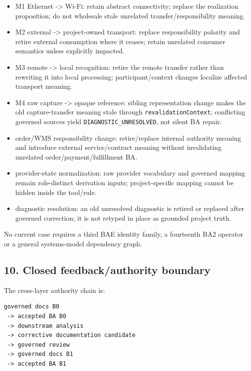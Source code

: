 \documentclass[11pt,a4paper]{article}
\providecommand{\tightlist}{\setlength{\itemsep}{0pt}\setlength{\parskip}{0pt}}
\begin{document}
\begin{itemize}
\tightlist
\item
  M1 Ethernet -\textgreater{} Wi-Fi: retain abstract connectivity; replace the realization proposition; do not wholesale stale unrelated transfer/responsibility meaning.
\item
  M2 external -\textgreater{} project-owned transport: replace responsibility polarity and retire external consumption where it ceases; retain unrelated consumer semantics unless explicitly impacted.
\item
  M3 remote -\textgreater{} local recognition: retire the remote transfer rather than rewriting it into local processing; participant/context changes localize affected transport meaning.
\item
  M4 raw capture -\textgreater{} opaque reference: sibling representation change makes the old capture-transfer meaning stale through \texttt{revalidationContext}; conflicting governed sources yield \texttt{DIAGNOSTIC\_UNRESOLVED}, not silent BA repair.
\item
  order/WMS responsibility change: retire/replace internal authority meaning and introduce external service/contract meaning without invalidating unrelated order/payment/fulfillment BA.
\item
  provider-state normalization: raw provider vocabulary and governed mapping remain role-distinct derivation inputs; project-specific mapping cannot be hidden inside the tool/rule.
\item
  diagnostic resolution: an old unresolved diagnostic is retired or replaced after governed correction; it is not retyped in place as grounded project truth.
\end{itemize}

No current case requires a third BAE identity family, a fourteenth BA2 operator or a general systems-model dependency graph.

\subsection{10. Closed feedback/authority boundary}\label{closed-feedbackauthority-boundary}

The cross-layer authority chain is:

\begin{verbatim}
governed docs B0
 -> accepted BA B0
 -> downstream analysis
 -> corrective documentation candidate
 -> governed review
 -> governed docs B1
 -> accepted BA B1
\end{verbatim}
\end{document}
